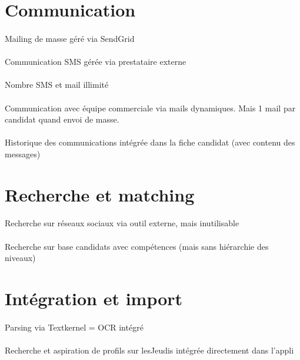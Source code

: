 \section{Communication}
\paragraph{} Mailing de masse géré via SendGrid
\paragraph{} Communication SMS gérée via prestataire externe
\paragraph{} Nombre SMS et mail illimité
\paragraph{} Communication avec équipe commerciale via mails dynamiques. Mais 1 mail par candidat quand envoi de masse.
\paragraph{} Historique des communications intégrée dans la fiche candidat (avec contenu des messages)



\section{Recherche et matching}
\paragraph{} Recherche sur réseaux sociaux via outil externe, mais inutilisable
\paragraph{} Recherche sur base candidats avec compétences (mais sans hiérarchie des niveaux)


\section{Intégration et import}
\paragraph{} Parsing via Textkernel = OCR intégré
\paragraph{} Recherche et aspiration de profils sur lesJeudis intégrée directement dans l'appli
